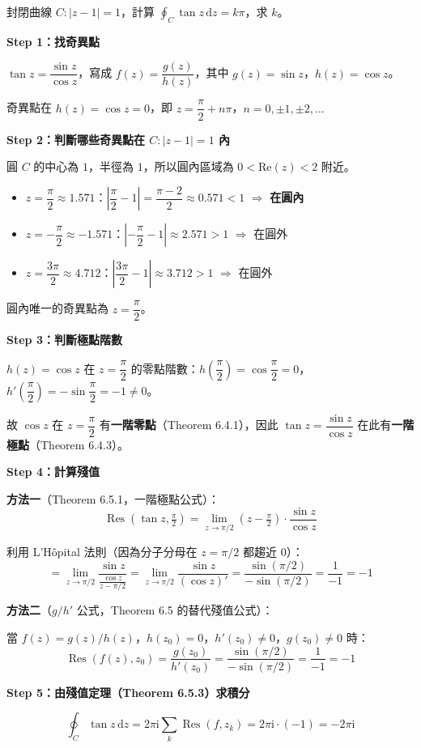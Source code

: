 \documentclass[12pt,a4paper]{article}
\newcommand{\dd}{\,\mathrm{d}}
\newcommand{\ii}{\mathrm{i}}
\newcommand{\Res}{\operatorname{Res}}
\begin{document}
\begin{qbox}[第 6 題]
封閉曲線 $C:|z-1|=1$，計算 $\displaystyle\oint_C\tan z\dd{z}=k\pi$，求 $k$。
\end{qbox}

\begin{solbox}[解]
\textbf{Step 1：找奇異點}

$\tan z=\dfrac{\sin z}{\cos z}$，寫成 $f(z)=\dfrac{g(z)}{h(z)}$，其中 $g(z)=\sin z$，$h(z)=\cos z$。

奇異點在 $h(z)=\cos z=0$，即 $z=\dfrac{\pi}{2}+n\pi$，$n=0,\pm 1,\pm 2,\ldots$

\textbf{Step 2：判斷哪些奇異點在 $C:|z-1|=1$ 內}

圓 $C$ 的中心為 $1$，半徑為 $1$，所以圓內區域為 $0<\text{Re}(z)<2$ 附近。

\begin{itemize}
\item $z=\dfrac{\pi}{2}\approx 1.571$：$\left|\dfrac{\pi}{2}-1\right|=\dfrac{\pi-2}{2}\approx 0.571<1$ $\Rightarrow$ \textbf{在圓內}
\item $z=-\dfrac{\pi}{2}\approx -1.571$：$\left|-\dfrac{\pi}{2}-1\right|\approx 2.571>1$ $\Rightarrow$ 在圓外
\item $z=\dfrac{3\pi}{2}\approx 4.712$：$\left|\dfrac{3\pi}{2}-1\right|\approx 3.712>1$ $\Rightarrow$ 在圓外
\end{itemize}

圓內唯一的奇異點為 $z=\dfrac{\pi}{2}$。

\textbf{Step 3：判斷極點階數}

$h(z)=\cos z$ 在 $z=\dfrac{\pi}{2}$ 的零點階數：$h\!\left(\dfrac{\pi}{2}\right)=\cos\dfrac{\pi}{2}=0$，$h'\!\left(\dfrac{\pi}{2}\right)=-\sin\dfrac{\pi}{2}=-1\ne 0$。

故 $\cos z$ 在 $z=\dfrac{\pi}{2}$ 有\textbf{一階零點}（Theorem 6.4.1），因此 $\tan z=\dfrac{\sin z}{\cos z}$ 在此有\textbf{一階極點}（Theorem 6.4.3）。

\textbf{Step 4：計算殘值}

\textbf{方法一}（Theorem 6.5.1，一階極點公式）：
$$\Res(\tan z,\tfrac{\pi}{2})=\lim_{z\to\pi/2}(z-\tfrac{\pi}{2})\cdot\frac{\sin z}{\cos z}$$

利用 L'H\^{o}pital 法則（因為分子分母在 $z=\pi/2$ 都趨近 $0$）：
$$=\lim_{z\to\pi/2}\frac{\sin z}{\frac{\cos z}{z-\pi/2}}=\lim_{z\to\pi/2}\frac{\sin z}{(\cos z)'}=\frac{\sin(\pi/2)}{-\sin(\pi/2)}=\frac{1}{-1}=-1$$

\textbf{方法二}（$g/h'$ 公式，Theorem 6.5 的替代殘值公式）：

當 $f(z)=g(z)/h(z)$，$h(z_0)=0$，$h'(z_0)\ne 0$，$g(z_0)\ne 0$ 時：
$$\Res(f(z),z_0)=\frac{g(z_0)}{h'(z_0)}=\frac{\sin(\pi/2)}{-\sin(\pi/2)}=\frac{1}{-1}=-1$$

\textbf{Step 5：由殘值定理（Theorem 6.5.3）求積分}

$$\oint_C\tan z\dd{z}=2\pi\ii\sum_k\Res(f,z_k)=2\pi\ii\cdot(-1)=-2\pi\ii$$
\end{solbox}
\end{document}
